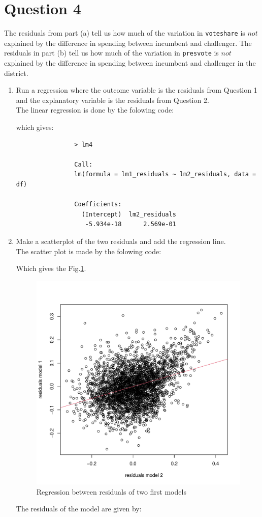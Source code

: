 \documentclass[12pt,letterpaper]{article}
\begin{document}
\newpage	
\section*{Question 4}
\noindent The residuals from part (a) tell us how much of the variation in \texttt{voteshare} is $not$ explained by the difference in spending between incumbent and challenger. The residuals in part (b) tell us how much of the variation in \texttt{presvote} is $not$ explained by the difference in spending between incumbent and challenger in the district.
	\begin{enumerate}
		\item Run a regression where the outcome variable is the residuals from Question 1 and the explanatory variable is the residuals from Question 2.	\\
			The linear regression is done by the folowing code:
			  
			which gives:
			\begin{verbatim}
				> lm4

				Call:
				lm(formula = lm1_residuals ~ lm2_residuals, data = df)
				
				Coefficients:
				  (Intercept)  lm2_residuals  
				   -5.934e-18      2.569e-01  
			\end{verbatim}	

		\item Make a scatterplot of the two residuals and add the regression line. 	\\
			The scatter plot is made by the folowing code:
			  
			Which gives the Fig.\ref{fig:lm_4}. \\
				
			\begin{figure}[h!]\centering
				\caption{\footnotesize Regression between residuals of two first models}
				\label{fig:lm_4}
				\includegraphics[width=.85\textwidth]{lm4.pdf}
			\end{figure}
			The residuals of the model are given by:\\
			

\end{enumerate}
\end{document}
